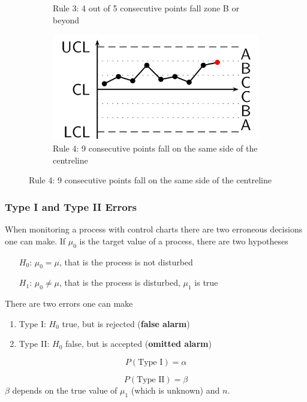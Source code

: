 \documentclass[11pt]{article}
\theoremstyle{definition}
\begin{document}
\begin{figure}[htb]
\begin{subfigure}{0.45\linewidth}
		\caption{Rule 3: 4 out of 5 consecutive points fall zone B or beyond}
	\end{subfigure}
	\hfill
	\begin{subfigure}{0.45\linewidth}
		\includegraphics[width=\linewidth]{img/western_electric_rule4.png}
		\caption{Rule 4: 9 consecutive points fall on the same side of the centreline}
	\end{subfigure}
\end{figure}

\subsubsection{Type I and Type II Errors}
When monitoring a process with control charts there are two erroneous decisions one can make. If $\mu_0$ is the target value of a process, there are two hypotheses
\begin{itemize}
	\item[$H_0$:] $\mu_0 = \mu$, that is the process is not disturbed
	\item[$H_1$:] $\mu_0 \neq \mu$, that is the process is disturbed, $\mu_1$ is true
\end{itemize}
There are two errors one can make
\begin{enumerate}
	\item Type I: $H_0$ true, but is rejected (\textbf{false alarm})
	\item Type II: $H_0$ false, but is accepted (\textbf{omitted alarm})
\end{enumerate}

\begin{equation*}
	P(\text{Type I}) = \alpha
\end{equation*}

\begin{equation*}
	P(\text{Type II}) = \beta
\end{equation*}
$\beta$ depends on the true value of $\mu_1$ (which is unknown) and $n$.
\end{document}
